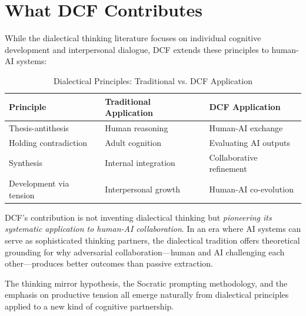 \section{What DCF Contributes}

While the dialectical thinking literature focuses on individual cognitive development and interpersonal dialogue, DCF extends these principles to human-AI systems:

\begin{table}[h]
\centering
\begin{tabular}{lll}
\toprule
\textbf{Principle} & \textbf{Traditional Application} & \textbf{DCF Application} \\
\midrule
Thesis-antithesis & Human reasoning & Human-AI exchange \\
Holding contradiction & Adult cognition & Evaluating AI outputs \\
Synthesis & Internal integration & Collaborative refinement \\
Development via tension & Interpersonal growth & Human-AI co-evolution \\
\bottomrule
\end{tabular}
\caption{Dialectical Principles: Traditional vs. DCF Application}
\end{table}

DCF's contribution is not inventing dialectical thinking but \emph{pioneering its systematic application to human-AI collaboration}. In an era where AI systems can serve as sophisticated thinking partners, the dialectical tradition offers theoretical grounding for why adversarial collaboration---human and AI challenging each other---produces better outcomes than passive extraction.

The thinking mirror hypothesis, the Socratic prompting methodology, and the emphasis on productive tension all emerge naturally from dialectical principles applied to a new kind of cognitive partnership.
